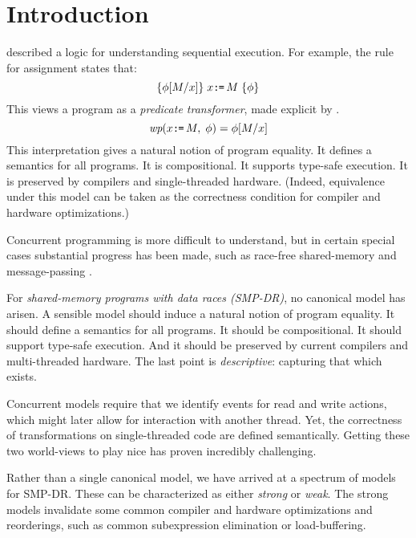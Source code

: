 \section{Introduction}
\label{sec:intro}

\citet{Hoare:1969:ABC:363235.363259} described a logic for understanding
sequential execution.  For example, the rule for assignment states that:
\begin{displaymath}
  \{\phi[M/x]\}\;x\texttt{:}\mkern-1mu\texttt{=}\,M\;\{\phi\}
\end{displaymath}
This views a program as a \emph{predicate transformer}, made explicit by
\citet{Dijkstra:1975:GCN:360933.360975}.
\begin{displaymath}
  \textit{wp}(x\texttt{:}\mkern-1mu\texttt{=}\,M,\;\phi) = \phi[M/x]
\end{displaymath}
This interpretation gives a natural notion of program equality.  It defines a
semantics for all programs.  It is compositional.  It supports type-safe
execution.  It is preserved by compilers and single-threaded hardware.
(Indeed, equivalence under this model can be taken as the correctness
condition for compiler and hardware optimizations.)


Concurrent programming is more difficult to understand, but in certain
special cases substantial progress has been made, such as race-free
shared-memory
\citep{OHearn:2007:RCL:1235896.1236121,OHearn:2019:SL:3310134.3211968} and
message-passing \citep{Hennessy:1980:ONC:646234.758793,Cleaveland2018}.

For \emph{shared-memory programs with data races (SMP-DR)}, no canonical
model has arisen.  A sensible model should induce a natural notion of program
equality.  It should define a semantics for all programs.  It should be
compositional.  It should support type-safe execution.  And it should be
preserved by current compilers and multi-threaded hardware.  The last point
is \emph{descriptive}: capturing that which exists.

Concurrent models require that we identify events for read and write actions,
which might later allow for interaction with another thread.  Yet, the
correctness of transformations on single-threaded code are defined
semantically.  Getting these two world-views to play nice has proven
incredibly challenging.

Rather than a single canonical model, we have arrived at a spectrum of models
for SMP-DR.  These can be characterized as either \emph{strong} or
\emph{weak}.  The strong models invalidate some common compiler and hardware
optimizations and reorderings, such as common subexpression elimination or
load-buffering.

